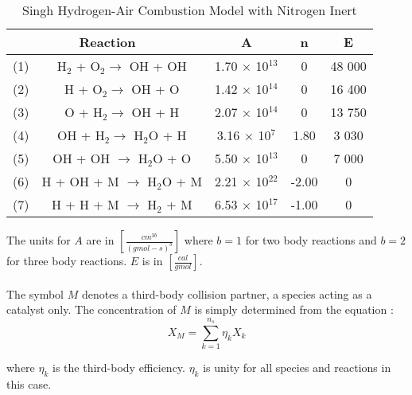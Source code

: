 \begin{table}
\begin{threeparttable}
\caption{Singh Hydrogen-Air Combustion Model with Nitrogen Inert}
\begin{tabular}{|cc|c|c|c|} \hline
\multicolumn{2}{|c|}{Reaction} & A & n & E  \\ \hline \hline
(1) & H$_{2}$ + O$_{2} \rightarrow$ OH + OH & 1.70 $\times$ 10$^{13}$ & 0 & 48 000 \\
(2) & H + O$_{2} \rightarrow$ OH + O & 1.42 $\times$ 10$^{14}$ & 0 & 16 400 \\
(3) & O + H$_{2} \rightarrow$ OH + H & 2.07 $\times$ 10$^{14}$ & 0 & 13 750 \\
(4) & OH + H$_{2} \rightarrow$ H$_{2}$O + H & 3.16 $\times$ 10$^{7}$ & 1.80 & 3 030 \\
(5) & OH + OH $\rightarrow$ H$_{2}$O + O & 5.50 $\times$ 10$^{13}$ & 0 & 7 000 \\
(6) & H + OH + M $\rightarrow$ H$_{2}$O + M & 2.21 $\times$ 10$^{22}$ & -2.00 & 0 \\
(7) & H + H + M $\rightarrow$ H$_{2}$ + M & 6.53 $\times$ 10$^{17}$ & -1.00 & 0 \\
\hline
\end{tabular}
\label{model}
\end{threeparttable}
\end{table}

The units for $A$ are in $[\frac{cm^{3b}}{(gmol-s)^b}]$ where $b=1$ for two body reactions and 
$b=2$ for three body reactions. $E$ is in $[\frac{cal}{gmol}]$.\\
\\

The symbol $M$ denotes a third-body collision partner, a species acting as a catalyst only.
The concentration of $M$ is simply determined from the equation :\\

\begin{displaymath}
X_M = \sum_{k=1}^{n_s} \eta_k X_k
\end{displaymath}

where $\eta_k$ is the third-body efficiency. $\eta_k$ is unity
for all species and reactions in this case. 

